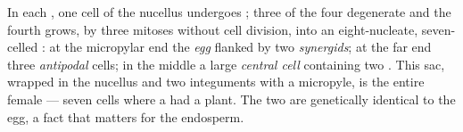 \begin{proposition}\label{prop:b2:angiosperm-reproduction:embryosac}
In each , one  cell of the nucellus undergoes ;
three of the four  degenerate and the fourth grows, by
three mitoses without cell division, into an eight-nucleate,
seven-celled \emph{}: at the micropylar end the \emph{egg}
flanked by two \emph{synergids}; at the far end three
\emph{antipodal} cells; in the middle a large \emph{central cell}
containing two \emph{}. This sac, wrapped in the nucellus
and two integuments with a micropyle, is the entire female
 --- seven cells where a  had a plant. The two  are genetically identical to the egg, a fact that matters for
the endosperm.
\end{proposition}

